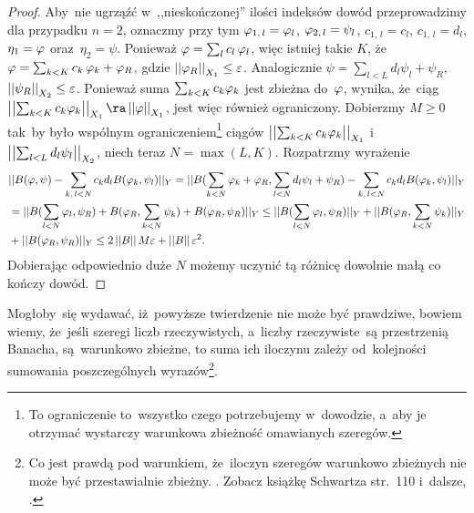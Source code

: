 \documentclass[a4paper,11pt]{article}
\begin{document}
\begin{proof}
  Aby~nie ugrząźć w~,,nieskończonej'' ilości indeksów dowód
  przeprowadzimy dla przypadku $n = 2$, oznaczmy przy tym
  $\varphi_{ 1,\, l } = \varphi_{ l }$, $\varphi_{ 2, \, l } = \psi_{ l }$,
  $c_{ 1, \, l } = c_{ l }$, $c_{ 1, \, l } = d_{ l }$,
  $\eta_{ 1 } = \varphi$ oraz~$\eta_{ 2 } = \psi$. Ponieważ
  $\varphi = \sum_{ l } c_{ l } \, \varphi_{ l }$, więc istniej takie $K$,
  że~$\varphi = \sum_{ k < K } c_{ k } \, \varphi_{ k } + \varphi_{ R }$, gdzie
  $\left|\left|  \varphi_{ R }  \right|\right|_{ X_{ 1 } } \leq \varepsilon$. Analogicznie
  $\psi = \sum_{ l < L } d_{ l } \psi_{ l } + \psi_{ R }$,
  $\left|\left|  \psi_{ R }  \right|\right|_{ X_{ 2 } } \leq \varepsilon$. Ponieważ suma
  $\sum_{ k < K } c_{ k } \varphi_{ k }$ jest zbieżna do~$\varphi$, wynika,
  że~ciąg
  $\norm{ \sum_{ k < K } c_{ k } \vp_{ k } }_{ X_{ 1 } } \ra \norm{
    \vp }_{ X_{ 1 } }$, jest więc również ograniczony. Dobierzmy
  $M \geq 0$ tak~by było wspólnym ograniczeniem\footnote{To
    ograniczenie to~wszystko czego potrzebujemy w~dowodzie, a~aby je
    otrzymać wystarczy warunkowa zbieżność omawianych szeregów.}
  ciągów $\left|\left|  \sum_{ k < K } c_{ k } \varphi_{ k }  \right|\right|_{ X_{ 1 } }$
  i~$\left|\left|  \sum_{ l < L } d_{ l } \psi_{ l }  \right|\right|_{ X_{ 2 } }$, niech
  teraz $N = \max( L, K )$. Rozpatrzmy wyrażenie
  \begin{equation*}
    \begin{split}
      & || B( \varphi, \psi ) - \sum\limits_{ k, \, l < N } c_{ k } d_{ l } B(
      \varphi_{ k }, \psi_{ l } ) ||_{ Y } = || B( \sum\limits_{ k < N } \varphi_{ k
      } + \varphi_{ R }, \sum\limits_{ l < N } d_{ l } \psi_{ l } + \psi_{ R }) -
      \sum\limits_{ k,\, l < N } c_{ k } d_{ l }
      B( \varphi_{ k }, \psi_{ l } ) ||_{ Y } \\
      &= || B( \sum\limits_{ l < N } \varphi_{ l }, \psi_{ R } ) + B( \varphi_{ R },
      \sum\limits_{ k < N } \psi_{ k } ) + B( \varphi_{ R }, \psi_{ R } ) ||_{ Y
      } \leq || B( \sum\limits_{ l < N } \varphi_{ l }, \psi_{ R } ) ||_{ Y }
      + || B( \varphi_{ R }, \sum\limits_{ k < N } \psi_{ k } ) ||_{ Y } \\
      &+ || B( \varphi_{ R }, \psi_{ R } ) ||_{ Y } \leq 2 \left|\left|  B  \right|\right| M
      \varepsilon + \left|\left|  B  \right|\right| \varepsilon^{ 2 }.
    \end{split}
  \end{equation*}
  Dobierając odpowiednio duże $N$ możemy uczynić tą różnicę dowolnie
  małą co kończy dowód.
\end{proof}

Mogłoby~się wydawać, iż~powyższe twierdzenie nie może być prawdziwe,
bowiem wiemy, że~jeśli szeregi liczb rzeczywistych, a~liczby
rzeczywiste~są przestrzenią Banacha, są~warunkowo zbieżne, to suma ich
iloczynu zależy od~kolejności sumowania poszczególnych
wyrazów\footnote{Co jest prawdą pod warunkiem, że~iloczyn szeregów
  warunkowo zbieżnych nie może być przestawialnie zbieżny. \Dok.
  Zobacz książkę Schwartza str.~110 i~dalsze,
  \cite{SchwartzKursAnalizyMatematycznej79}.}.
\end{document}
